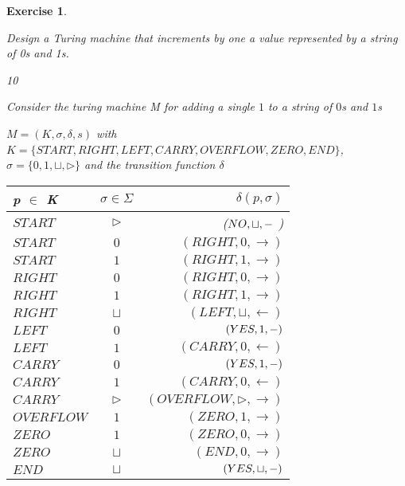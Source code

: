 \documentclass [11pt]{article}
\newtheorem{exercise}[theorem]{Exercise}
\newcommand{\solution}[1]{\noindent {\bf Solution.}  #1}
\begin{document}
\begin{exercise}
  \label{ex:turing}

  Design a Turing machine that increments by one a value represented by a string of 0s and 1s.
  
\bigskip  
  
\solution{10}

Consider the turing machine M for adding a single $1$ to a string of $0$s and $1$s

\medskip

$M=(K, \sigma, \delta, s)$ with $K = \{START, RIGHT, LEFT, CARRY, OVERFLOW, ZERO, END\}$, $\sigma=\{0, 1, \sqcup, \triangleright\}$ and the transition function $\delta$

\bigskip
  
\begin{tabular}{|l|c||r|}
\hline p $\in $ K   & $\sigma \in \Sigma $  & $\delta(p, \sigma)$ \\ 
\hline
\hline  $START$  & $\triangleright$ & ($NO, \sqcup,\--$ ) \\ 
\hline  $START$ & $0$  & $(RIGHT, 0, \rightarrow)$\\ 
\hline  $START$ & $1$  & $(RIGHT, 1, \rightarrow)$ \\ 

\hline  $RIGHT$ & $0$  & $(RIGHT, 0, \rightarrow)$ \\ 
\hline  $RIGHT$ & $1$  & $(RIGHT, 1, \rightarrow)$ \\ 
\hline  $RIGHT$ & $\sqcup$  & $(LEFT, \sqcup, \leftarrow)$ \\ 

\hline  $LEFT$ & $0$  & $(YES, 1, \--)$ \\ 
\hline  $LEFT$ & $1$  & $(CARRY, 0, \leftarrow)$\\ 

\hline  $CARRY$ & $0$  &$(YES, 1, \--)$\\ 
\hline  $CARRY$ & $1$  & $(CARRY, 0, \leftarrow)$\\ 
\hline  $CARRY$  & $\triangleright$ & $(OVERFLOW, \triangleright, \rightarrow)$ \\ 

\hline  $OVERFLOW$ & $1$  & $(ZERO, 1, \rightarrow)$ \\ 

\hline  $ZERO$ & $1$  & $(ZERO, 0, \rightarrow)$ \\ 
\hline  $ZERO$ & $\sqcup$  & $(END, 0, \rightarrow)$ \\ 

\hline  $END$ & $\sqcup$  & $(YES, \sqcup, \--)$ \\ 

\hline 
\end{tabular} 
\end{exercise}


\end{document}

